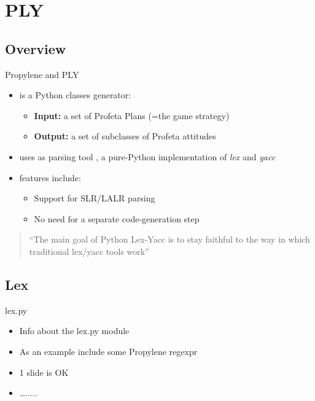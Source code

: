 \section{PLY}

\subsection{Overview}
\begin{frame}{Propylene and PLY}  
  \begin{itemize}
    \item {} is a Python classes generator:
\n
    \begin{itemize}
      \item \textbf{Input:} a set of Profeta Plans (=the game strategy)
\n  
      \item \textbf{Output:} a set of subclasses of Profeta attitudes 
    \end{itemize}
\N
    \item {} uses as parsing tool , a pure-Python
    implementation of \emph{lex} and \emph{yacc}
    \item
\N\n
     features include:
    \begin{itemize}
      \item Support for SLR/LALR parsing
      \item No need for a separate code-generation step
    \end{itemize}
  \end{itemize}
  \begin{quote}
    \begin{center}
      ``The main goal of Python Lex-Yacc is to stay faithful to the way in 
      which traditional lex/yacc tools work''
    \end{center}
  \end{quote}
%
\N\N
\end{frame}


\subsection{Lex}
\begin{frame}{lex.py}
  \begin{itemize}
    \item Info about the lex.py module
\N
    \item As an example include some Propylene regexpr 
\N
    \item 1 slide is OK
\N
    \item \ldots.....
 
  \end{itemize}
%
\N\N
\end{frame}


